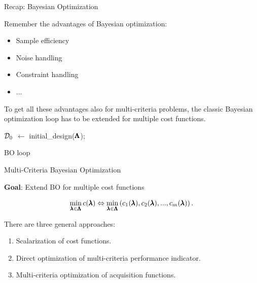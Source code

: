 \begin{frame}[allowframebreaks]{Recap: Bayesian Optimization}

Remember the advantages of Bayesian optimization:

    \begin{itemize}
        \item Sample efficiency
        \item Noise handling
        \item Constraint handling
        \item ...
    \end{itemize}

To get all these advantages also for multi-criteria problems, the classic Bayesian optimization loop has to be extended for multiple cost functions.

\framebreak

\begin{algorithm}[H]
	\BlankLine
	$\mathcal{D}_0$ $\leftarrow$ initial\_design($\pmb{\Lambda}$);

	\For{\bocount = $1, 2, \ldots \bobudget - |\dataset_0|$}{
		$\surro$ $\leftarrow$ fit predictive model on $\dataset_{\bocount-1}$;

		select $\bonextsample$ by optimizing $\bonextsample \in \argmax_{\conf \in \pcs} \acq(\conf; \dataset_{\bocount-1}, \surro)$;

		Query $\bonextobs := \func(\bonextsample)$;

		Add observation to data $\dataset_{\bocount} := \dataset_{\bocount-1} \cup \{\langle \bonextsample, \bonextobs \rangle \}$;\\
	}
	\caption{BO loop}
\end{algorithm}

\end{frame}

\begin{frame}{Multi-Criteria Bayesian Optimization}

\textbf{Goal}: Extend BO for multiple cost functions

$$
\min_{\pmb{\lambda} \in \pmb{\Lambda}}  c(\pmb{\lambda}) \Leftrightarrow \min_{\pmb{\lambda} \in \pmb{\Lambda}} \left(c_1(\pmb{\lambda}), c_2(\pmb{\lambda}), ..., c_m(\pmb{\lambda})\right).
$$


There are three general approaches:


\begin{enumerate}
        \item Scalarization of cost functions.
        \item Direct optimization of multi-criteria performance indicator.
        \item Multi-criteria optimization of acquisition functions.
\end{enumerate}


\end{frame}

